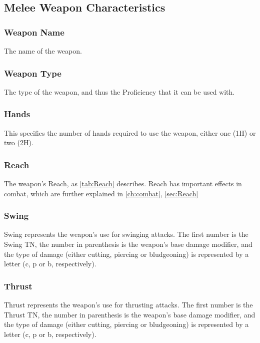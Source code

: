 \documentclass[oneside,11pt,english]{book}
\begin{document}
\subsection{Melee Weapon Characteristics} %
\subsubsection{Weapon Name}
The name of the weapon.
\subsubsection{Weapon Type}
The type of the weapon, and thus the Proficiency that it can be used with.
\subsubsection{Hands}
This specifies the number of hands required to use the weapon, either one (1H)
or two (2H).
\subsubsection{Reach}
The weapon’s Reach, as \autoref{tab:Reach} describes. Reach has important
effects in combat, which are further explained in \autoref{ch:combat},
\autoref{sec:Reach}

\subsubsection{Swing}
Swing represents the weapon’s use for swinging attacks. The first number is the
Swing TN, the number in parenthesis is the weapon’s base damage modifier, and
the type of damage (either cutting, piercing or bludgeoning) is represented by a
letter (c, p or b, respectively).
\subsubsection{Thrust}
Thrust represents the weapon’s use for thrusting attacks. The first number is
the Thrust TN, the number in parenthesis is the weapon’s base damage modifier,
and the type of damage (either cutting, piercing or bludgeoning) is represented
by a letter (c, p or b, respectively).
\end{document}
